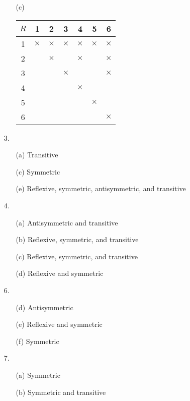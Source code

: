 \documentclass{article}
\begin{document}
\begin{enumerate}
\begin{itemize}
            \item[(c)] \hfill

                \begin{tabular}{c|cccccc}
                $R$ & 1 & 2 & 3 & 4 & 5 & 6 \\\hline
                1 & $\times$ & $\times$ & $\times$ & $\times$ & $\times$ & $\times$ \\
                2 & & $\times$ & & $\times$ & & $\times$ \\
                3 & & & $\times$ & & & $\times$ \\
                4 & & & & $\times$ & & \\
                5 & & & & & $\times$ & \\
                6 & & & & & & $\times$
                \end{tabular}
        \end{itemize}
    \item[3.]
        \begin{itemize}
            \item[(a)] Transitive
            \item[(c)] Symmetric
            \item[(e)] Reflexive, symmetric, antisymmetric, and transitive
        \end{itemize}
    \item[4.]
        \begin{itemize}
            \item[(a)] Antisymmetric and transitive
            \item[(b)] Reflexive, symmetric, and transitive
            \item[(c)] Reflexive, symmetric, and transitive
            \item[(d)] Reflexive and symmetric
        \end{itemize}
    \item[6.]
        \begin{itemize}
            \item[(d)] Antisymmetric
            \item[(e)] Reflexive and symmetric
            \item[(f)] Symmetric
        \end{itemize}
    \item[7.]
        \begin{itemize}
            \item[(a)] Symmetric
            \item[(b)] Symmetric and transitive

\end{itemize}
\end{enumerate}
\end{document}
